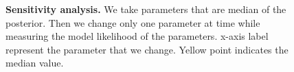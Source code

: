 \documentclass[12pt]{extarticle}
\begin{document}
\begin{figure}[p]
\begin{subfigure}{0.3\textwidth}
      \label{fig:sensitivity-eumt}
  \end{subfigure}
  \caption{
    \textbf{Sensitivity analysis.} We take parameters that are median of the posterior. Then we change only one parameter at time while measuring the model likelihood of the parameters. x-axis label represent the parameter that we change. Yellow point indicates the median value.
  }
  \label{fig:sensitivity}
\end{figure}
\end{document}
